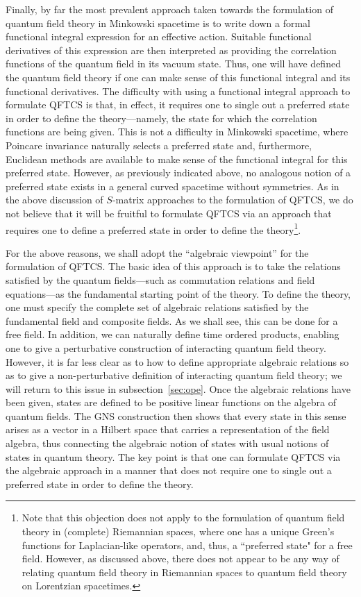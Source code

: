 \documentclass[12pt]{article}
\theoremstyle{plain}
\theoremstyle{definition}
\begin{document}
Finally, by far the most prevalent approach taken towards the formulation of quantum field theory in Minkowski spacetime is to write down a formal functional integral expression for an effective action. Suitable functional derivatives of this expression are then interpreted as providing the correlation functions of the quantum field in its vacuum state. Thus, one will have defined the quantum field theory if one can make sense of this functional integral and its functional derivatives. The difficulty with using a functional integral approach to formulate QFTCS is that, in effect, it requires one to single out a preferred state in order to define the theory---namely, the state for which the correlation functions are being given. This is not a difficulty in Minkowski spacetime, where Poincare invariance naturally selects a preferred state and, furthermore, Euclidean methods are available to make sense of the functional integral for this preferred state. However, as previously indicated above, no analogous notion of a preferred state exists in a general curved spacetime without symmetries. As in the above discussion of $S$-matrix approaches to the formulation of QFTCS, we do not believe that it will be fruitful to formulate QFTCS via an approach that requires one to define a preferred state in order to define the theory\footnote{Note that this objection does not apply to the formulation of quantum field theory in (complete) Riemannian spaces, where one has a unique Green's functions for Laplacian-like operators, and, thus, a ``preferred state" for a free field. However, as discussed above, there does not appear to be any way of relating quantum field theory in Riemannian spaces to quantum field theory on Lorentzian spacetimes.}.

For the above reasons, we shall adopt the ``algebraic viewpoint'' for the formulation of QFTCS. The basic idea of this approach is to take the relations satisfied by the quantum fields---such as commutation relations and field equations---as the fundamental starting point of the theory. To define the theory, one must specify the complete set of algebraic relations satisfied by the fundamental field and composite fields. As we shall see, this can be done for a free field. In addition, we can naturally define time ordered products, enabling one to give a perturbative construction of interacting quantum field theory. However, it is far less clear as to how to define appropriate algebraic relations so as to give a non-perturbative definition of interacting quantum field theory; we will return to this issue in subsection~\ref{sec:ope}. Once the algebraic relations have been given, states are defined to be positive linear functions on the algebra of quantum fields. The GNS construction then shows that every state in this sense arises as a vector in a Hilbert space that carries a representation of the field algebra, thus connecting the algebraic notion of states with usual notions of states in quantum theory. The key point is that one can formulate QFTCS via the algebraic approach in a manner that does not require one to single out a preferred state in order to define the theory.
\end{document}
